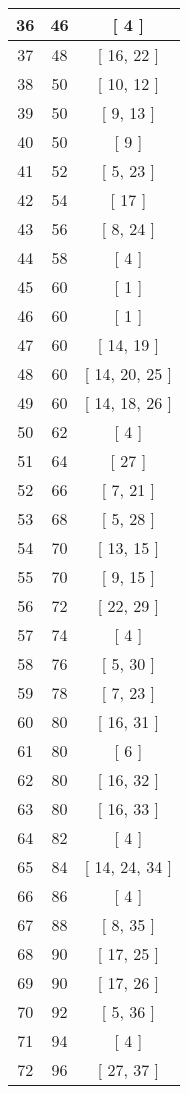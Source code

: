 \begin{center}
\begin{longtable}[H]{|| c c c ||}
\hline
36 & 46 & [ 4 ] \\ 
\hline
37 & 48 & [ 16, 22 ] \\ 
\hline
38 & 50 & [ 10, 12 ] \\ 
\hline
39 & 50 & [ 9, 13 ] \\ 
\hline
40 & 50 & [ 9 ] \\ 
\hline
41 & 52 & [ 5, 23 ] \\ 
\hline
42 & 54 & [ 17 ] \\ 
\hline
43 & 56 & [ 8, 24 ] \\ 
\hline
44 & 58 & [ 4 ] \\ 
\hline
45 & 60 & [ 1 ] \\ 
\hline
46 & 60 & [ 1 ] \\ 
\hline
47 & 60 & [ 14, 19 ] \\ 
\hline
48 & 60 & [ 14, 20, 25 ] \\ 
\hline
49 & 60 & [ 14, 18, 26 ] \\ 
\hline
50 & 62 & [ 4 ] \\ 
\hline
51 & 64 & [ 27 ] \\ 
\hline
52 & 66 & [ 7, 21 ] \\ 
\hline
53 & 68 & [ 5, 28 ] \\ 
\hline
54 & 70 & [ 13, 15 ] \\ 
\hline
55 & 70 & [ 9, 15 ] \\ 
\hline
56 & 72 & [ 22, 29 ] \\ 
\hline
57 & 74 & [ 4 ] \\ 
\hline
58 & 76 & [ 5, 30 ] \\ 
\hline
59 & 78 & [ 7, 23 ] \\ 
\hline
60 & 80 & [ 16, 31 ] \\ 
\hline
61 & 80 & [ 6 ] \\ 
\hline
62 & 80 & [ 16, 32 ] \\ 
\hline
63 & 80 & [ 16, 33 ] \\ 
\hline
64 & 82 & [ 4 ] \\ 
\hline
65 & 84 & [ 14, 24, 34 ] \\ 
\hline
66 & 86 & [ 4 ] \\ 
\hline
67 & 88 & [ 8, 35 ] \\ 
\hline
68 & 90 & [ 17, 25 ] \\ 
\hline
69 & 90 & [ 17, 26 ] \\ 
\hline
70 & 92 & [ 5, 36 ] \\ 
\hline
71 & 94 & [ 4 ] \\ 
\hline
72 & 96 & [ 27, 37 ] \\ 

\end{longtable}
\end{center}
